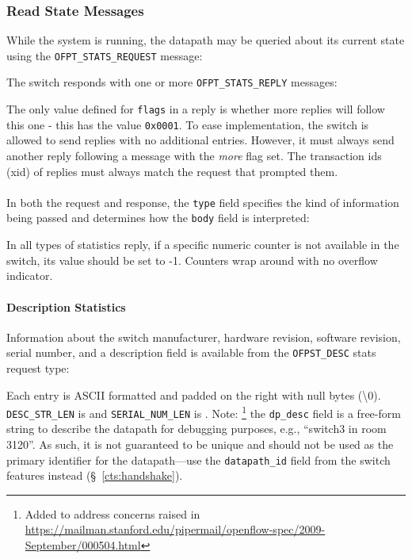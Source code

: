 


\subsubsection{Read State Messages}
While the system is running, the datapath may be queried about its current state using the \verb|OFPT_STATS_REQUEST| message:


The switch responds with one or more \verb|OFPT_STATS_REPLY| messages:


The only value defined for \verb|flags| in a reply is whether more replies will follow this one - this has the value \verb|0x0001|.  To ease implementation, the switch is allowed to send replies with no additional entries.  However, it must always send another reply following a message with the \emph{more} flag set.  The transaction ids (xid) of replies must always match the request that prompted them.
\\\\
In both the request and response, the \verb|type| field specifies the kind of information being passed and determines how the \verb|body| field is interpreted:



In all types of statistics reply, if a specific numeric counter is not available in the switch, its value should be set to -1. Counters wrap around with no overflow indicator.

\paragraph{Description Statistics}
Information about the switch manufacturer, hardware revision, software revision, serial number, and a description field is available from the \verb|OFPST_DESC| stats request type:


Each entry is ASCII formatted and padded on the right with null bytes (\textbackslash0).  \verb|DESC_STR_LEN| is and \verb|SERIAL_NUM_LEN| is .  Note: \footnote{Added to address concerns raised in \url{https://mailman.stanford.edu/pipermail/openflow-spec/2009-September/000504.html}} the \verb|dp_desc| field is a free-form string to describe the datapath for debugging purposes, e.g., ``switch3 in room 3120''.  As such, it is not guaranteed to be unique and should not be used as the primary identifier for the datapath---use the \verb|datapath_id| field from the switch features instead (\S~\ref{cts:handshake}).

